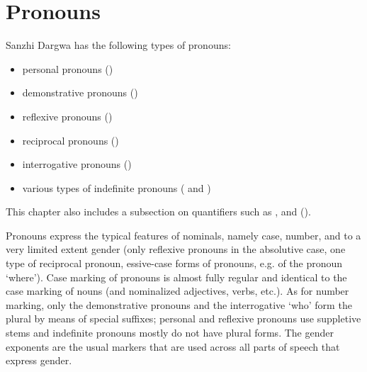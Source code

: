 \chapter{Pronouns}
\label{cpt:pronouns}




Sanzhi Dargwa has the following types of pronouns:
%
\begin{itemize}
	\item	personal pronouns ()
	\item	demonstrative pronouns ()
	\item	reflexive pronouns ()
	\item	reciprocal pronouns ()
	\item	interrogative pronouns ()
	\item	various types of indefinite pronouns ( and )
\end{itemize}
%
This chapter also includes a subsection on quantifiers such as ,  and  (). 

Pronouns express the typical features of nominals, namely case, number, and to a very limited extent gender (only reflexive pronouns in the absolutive case, one type of reciprocal pronoun, essive-case forms of pronouns, e.g. of the pronoun `where'). Case marking of pronouns is almost fully regular and identical to the case marking of nouns (and nominalized adjectives, verbs, etc.). As for number marking, only the demonstrative pronouns and the interrogative `who' form the plural by means of special suffixes; personal and reflexive pronouns use suppletive stems and indefinite pronouns mostly do not have plural forms. The gender exponents are the usual markers that are used across all parts of speech that express gender.



